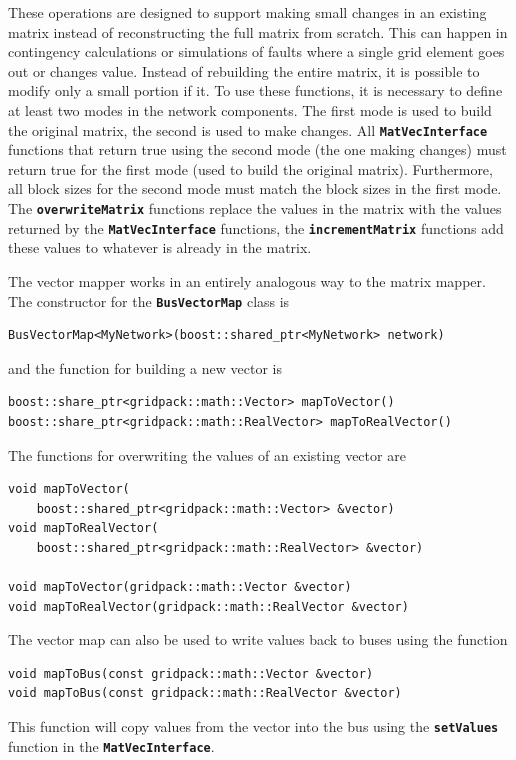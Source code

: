 These operations are designed to support making small changes in an existing matrix instead of reconstructing the full matrix from scratch. This can happen in contingency calculations or simulations of faults where a single grid element goes out or changes value. Instead of rebuilding the entire matrix, it is possible to modify only a small portion if it. To use these functions, it is necessary to define at least two modes in the network components. The first mode is used to build the original matrix, the second is used to make changes. All \texttt{\textbf{MatVecInterface}} functions that return true using the second mode (the one making changes) must return true for the first mode (used to build the original matrix). Furthermore, all block sizes for the second mode must match the block sizes in the first mode. The \texttt{\textbf{overwriteMatrix}} functions replace the values in the matrix with the values returned by the \texttt{\textbf{MatVecInterface}} functions, the \texttt{\textbf{incrementMatrix}} functions add these values to whatever is already in the matrix.

The vector mapper works in an entirely analogous way to the matrix mapper. The constructor for the \texttt{\textbf{BusVectorMap}} class is

{
\color{red}
\begin{Verbatim}[fontseries=b]
BusVectorMap<MyNetwork>(boost::shared_ptr<MyNetwork> network)
\end{Verbatim}
}

and the function for building a new vector is

{
\color{red}
\begin{Verbatim}[fontseries=b]
boost::share_ptr<gridpack::math::Vector> mapToVector()
boost::share_ptr<gridpack::math::RealVector> mapToRealVector()
\end{Verbatim}
}

The functions for overwriting the values of an existing vector are

{
\color{red}
\begin{Verbatim}[fontseries=b]
void mapToVector(
    boost::shared_ptr<gridpack::math::Vector> &vector)
void mapToRealVector(
    boost::shared_ptr<gridpack::math::RealVector> &vector)

void mapToVector(gridpack::math::Vector &vector)
void mapToRealVector(gridpack::math::RealVector &vector)
\end{Verbatim}
}

The vector map can also be used to write values back to buses using the function

{
\color{red}
\begin{Verbatim}[fontseries=b]
void mapToBus(const gridpack::math::Vector &vector)
void mapToBus(const gridpack::math::RealVector &vector)
\end{Verbatim}
}

This function will copy values from the vector into the bus using the \texttt{\textbf{setValues}} function in the \texttt{\textbf{MatVecInterface}}.
\newline
\hyperlink{topDoc}{\color{blue}{Top}}
